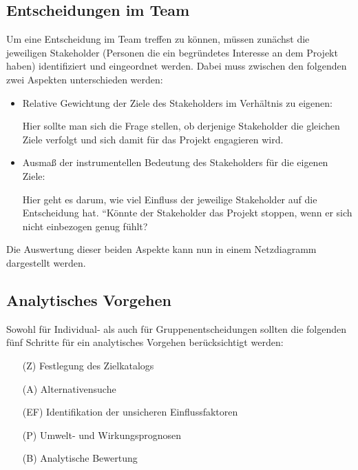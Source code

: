 \documentclass{panikzettel}
\begin{document}
\subsection{Entscheidungen im Team}
Um eine Entscheidung im Team treffen zu können, müssen zunächst die jeweiligen Stakeholder (Personen die ein begründetes Interesse an dem Projekt haben) identifiziert und eingeordnet werden. Dabei muss zwischen den folgenden zwei Aspekten unterschieden werden:
\begin{itemize}
	\item Relative Gewichtung der Ziele des Stakeholders im Verhältnis zu eigenen:

	Hier sollte man sich die Frage stellen, ob derjenige Stakeholder die gleichen Ziele verfolgt und sich damit für das Projekt engagieren wird.

	\item Ausmaß der instrumentellen Bedeutung des Stakeholders für die eigenen Ziele:

	Hier geht es darum, wie viel Einfluss der jeweilige Stakeholder auf die Entscheidung hat. ``Könnte der Stakeholder das Projekt stoppen, wenn er sich nicht einbezogen genug fühlt?\grqq
\end{itemize}
Die Auswertung dieser beiden Aspekte kann nun in einem Netzdiagramm dargestellt werden.

\subsection{Analytisches Vorgehen \cite{vonNitzsch:211553}}
Sowohl für Individual- als auch für Gruppenentscheidungen sollten die folgenden fünf Schritte für ein analytisches Vorgehen berücksichtigt werden:
\begin{enumerate}
	\item[(Z)] Festlegung des Zielkatalogs
	\item[(A)] Alternativensuche
	\item[(EF)] Identifikation der unsicheren Einflussfaktoren
	\item[(P)] Umwelt- und Wirkungsprognosen
	\item[(B)] Analytische Bewertung
\end{enumerate}

\newpage
\end{document}
